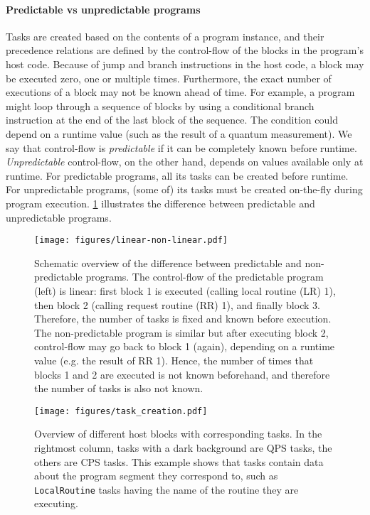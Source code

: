 \paragraph{Predictable vs unpredictable programs}
Tasks are created based on the contents of a program instance, and their precedence relations are defined by the control-flow of the blocks in the program's host code.
Because of jump and branch instructions in the host code, a block may be executed zero, one or multiple times.
Furthermore, the exact number of executions of a block may not be known ahead of time.
For example, a program might loop through a sequence of blocks by using a conditional branch instruction at the end of the last block of the sequence.
The condition could depend on a runtime value (such as the result of a quantum measurement).
We say that control-flow is \textit{predictable} if it can be completely known before runtime. 
\textit{Unpredictable} control-flow, on the other hand, depends on values available only at runtime. 
For predictable programs, all its tasks can be created before runtime.
For unpredictable programs, (some of) its tasks must be created on-the-fly during program execution.
\cref{fig:app:linear_non_linear} illustrates the difference between predictable and unpredictable programs.

\begin{figure}[ht]
    \centering
    \texttt{[image: figures/linear-non-linear.pdf]}
    \caption{Schematic overview of the difference between predictable and non-predictable programs.
    The control-flow of the predictable program (left) is linear: first block 1 is executed (calling local routine (LR) 1), then block 2 (calling request routine (RR) 1), and finally block 3.
    Therefore, the number of tasks is fixed and known before execution.
    The non-predictable program is similar but after executing block 2, control-flow may go back to block 1 (again), depending on a runtime value (e.g. the result of RR 1).
    Hence, the number of times that blocks 1 and 2 are executed is not known beforehand, and therefore the number of tasks is also not known.
    }
    \label{fig:app:linear_non_linear}
\end{figure}

\begin{figure*}
    \centering
    \texttt{[image: figures/task\_creation.pdf]}
    \caption{Overview of different host blocks with corresponding tasks. In the rightmost column, tasks with a dark background are QPS tasks, the others are CPS tasks. This example shows that tasks contain data about the program segment they correspond to, such as \texttt{LocalRoutine} tasks having the name of the routine they are executing.}
    \label{fig:app:task_creation}
\end{figure*}


